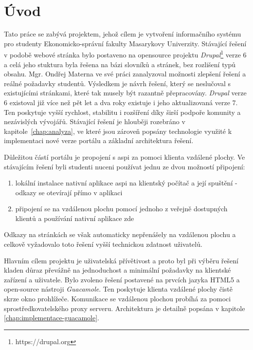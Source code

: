 \chapter{Úvod}
Tato práce se zabývá projektem, jehož cílem je vytvoření informačního systému pro studenty Ekonomicko-správní fakulty Masarykovy Univerzity. Stávající řešení v podobě webové stránka bylo postaveno na \gls{opensource} projektu \emph{Drupal}\footnote{https://drupal.org} verze 6 a celá jeho stuktura byla řešena na bázi slovníků a stránek, bez rozlišení typů obsahu. Mgr. Ondřej Materna ve své práci zanalyzoval možnosti zlepšení řešení a reálné požadavky studentů. Výsledkem je návrh řešení, který se neslučoval s existujícími stránkami, které tak musely být razantně přepracovány. \emph{Drupal} verze 6 existoval již více než pět let a dva roky existuje i jeho aktualizovaná verze 7\cite{website:wiki:drupal}. Ten poskytuje vyšší rychlost, stabilitu i rozšíření díky širší podpoře komunity a nezávislých vývojářů. Stávající řešení je hlouběji rozebráno v kapitole~\ref{chap:analyza}, ve které jsou zároveň popsány technologie využité k implementaci nové verze portálu a základní architektura řešení.

Důležitou částí portálu je propojení s \gls{aspi} za pomoci klienta vzdálené plochy. Ve stávajícím řešení byli studenti nuceni používat jednu ze dvou možností připojení:

\begin{enumerate}
  \item lokální instalace nativní aplikace \gls{aspi} na klientský počítač a  její spuštění - odkazy se otevírají přímo v aplikaci
  \item připojení se na vzdálenou plochu pomocí jednoho z veřejně dostupných klientů a používání nativní aplikace zde
\end{enumerate}

Odkazy na stránkách se však automaticky nepřenášely na vzdálenou plochu a celkově vyžadovalo toto řešení vyšší technickou zdatnost uživatelů.

Hlavním cílem projektu je uživatelská přívětivost a proto byl při výběru řešení kladen důraz převážně na jednoduchost a minimální požadavky na klientské zařízení a uživatele. Bylo zvoleno řešení postavené na prvcích jazyka HTML5 a open-source nástroji \emph{Guacamole}. Ten poskytuje klienta vzdálené plochy čistě skrze okno prohlížeče. Komunikace se vzdálenou plochou probíhá za pomoci sprostředkovatelského proxy serveru. Architektura je detailně popsána v kapitole \ref{chap:implementace-guacamole}.

